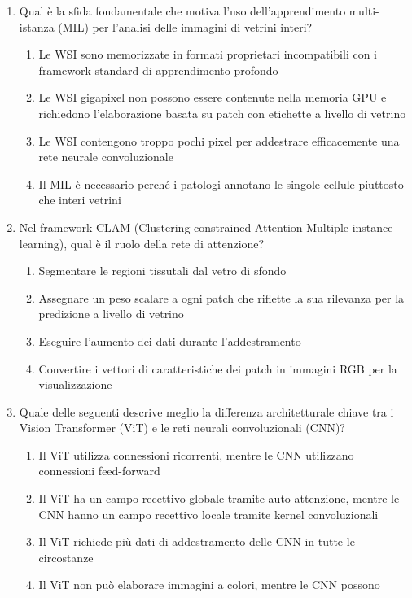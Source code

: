 \begin{enumerate}
  \item \label{ch4:q4} Qual è la sfida fondamentale che motiva l'uso dell'apprendimento multi-istanza (MIL) per l'analisi delle immagini di vetrini interi?
  \begin{enumerate}[label=\Alph*.]
    \item Le WSI sono memorizzate in formati proprietari incompatibili con i framework standard di apprendimento profondo
    \item Le WSI gigapixel non possono essere contenute nella memoria GPU e richiedono l'elaborazione basata su patch con etichette a livello di vetrino
    \item Le WSI contengono troppo pochi pixel per addestrare efficacemente una rete neurale convoluzionale
    \item Il MIL è necessario perché i patologi annotano le singole cellule piuttosto che interi vetrini
  \end{enumerate}

  \item \label{ch4:q5} Nel framework CLAM (Clustering-constrained Attention Multiple instance learning), qual è il ruolo della rete di attenzione?
  \begin{enumerate}[label=\Alph*.]
    \item Segmentare le regioni tissutali dal vetro di sfondo
    \item Assegnare un peso scalare a ogni patch che riflette la sua rilevanza per la predizione a livello di vetrino
    \item Eseguire l'aumento dei dati durante l'addestramento
    \item Convertire i vettori di caratteristiche dei patch in immagini RGB per la visualizzazione
  \end{enumerate}

  \item \label{ch4:q6} Quale delle seguenti descrive meglio la differenza architetturale chiave tra i Vision Transformer (ViT) e le reti neurali convoluzionali (CNN)?
  \begin{enumerate}[label=\Alph*.]
    \item Il ViT utilizza connessioni ricorrenti, mentre le CNN utilizzano connessioni feed-forward
    \item Il ViT ha un campo recettivo globale tramite auto-attenzione, mentre le CNN hanno un campo recettivo locale tramite kernel convoluzionali
    \item Il ViT richiede più dati di addestramento delle CNN in tutte le circostanze
    \item Il ViT non può elaborare immagini a colori, mentre le CNN possono
  \end{enumerate}


\end{enumerate}
